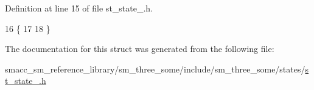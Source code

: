 Definition at line 15 of file st\+\_\+state\+\_.\+h.


\begin{DoxyCode}
16     \{
17     
18     \}
\end{DoxyCode}


The documentation for this struct was generated from the following file\+:\begin{DoxyCompactItemize}
\item 
smacc\+\_\+sm\+\_\+reference\+\_\+library/sm\+\_\+three\+\_\+some/include/sm\+\_\+three\+\_\+some/states/\hyperlink{st__state__4_8h}{st\+\_\+state\+\_.\+h}\end{DoxyCompactItemize}

